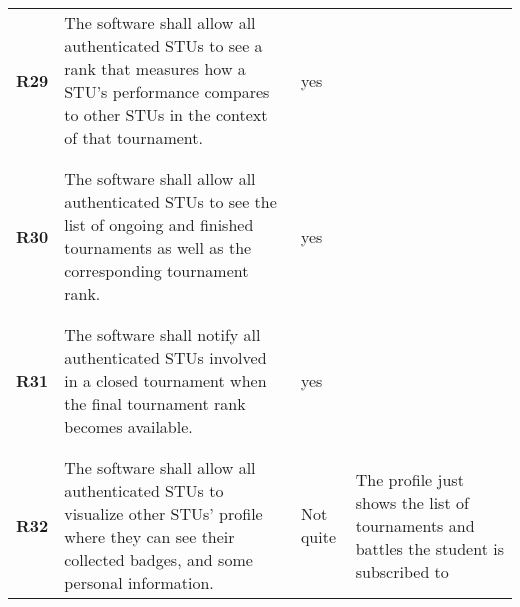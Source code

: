 \begin{longtable}[H]{l p{6.5cm} l p{3cm}}
    \textbf{R29} & The software shall allow all authenticated STUs to see a rank that measures how a STU's performance compares to other STUs in the context of that tournament.                                                         & {\color{green}yes}   &                                                                                         \\
                 &                                                                                                                                                                                                                       &                      &                                                                                         \\\hline & & & \\
    \textbf{R30} & The software shall allow all authenticated STUs to see the list of ongoing and finished tournaments as well as the corresponding tournament rank.                                                                     & {\color{green}yes}   &                                                                                         \\
                 &                                                                                                                                                                                                                       &                      &                                                                                         \\\hline & & & \\
    \textbf{R31} & The software shall notify all authenticated STUs involved in a closed tournament when the final tournament rank becomes available.                                                                                    & {\color{green}yes}   &                                                                                         \\
                 &                                                                                                                                                                                                                       &                      &                                                                                         \\\hline & & & \\
    \textbf{R32} & The software shall allow all authenticated STUs to visualize other STUs' profile where they can see their collected badges, and some personal information.                                                            & Not quite            & The profile just shows the list of tournaments and battles the student is subscribed to \\

\end{longtable}
